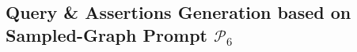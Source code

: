 \documentclass[11pt]{article}
\begin{document}
\text{} \\
\text{} \\
\text{} \\
\text{} \\
\text{} \\
\text{} \\
\text{} \\
\text{} \\
\text{} \\
\text{} \\
\text{} \\
\text{}

\subsection{Query \& Assertions Generation based on Sampled-Graph Prompt \hyperref[fig:p6]{$ \mathcal{P}_6 $}}
\end{document}
